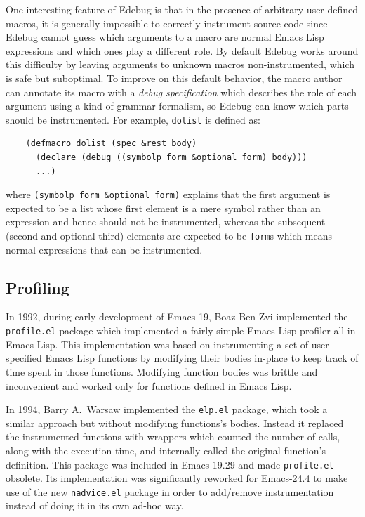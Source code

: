\documentclass[format=acmsmall, review]{acmart}
\newcommand \Elisp {Emacs Lisp}
\begin{document}
One interesting feature of Edebug is that in the presence of arbitrary
user-defined macros, it is generally impossible to correctly instrument
source code since Edebug cannot guess which arguments to a macro are normal
\Elisp{} expressions and which ones play a different role.  By default
Edebug works around this difficulty by leaving arguments to unknown macros
non-instrumented, which is safe but suboptimal.  To improve on this default
behavior, the macro author can annotate its macro with a \emph{debug
  specification} which describes the role of each argument using a kind of
grammar formalism, so Edebug can know which parts should be
instrumented.  For example, \texttt{dolist} is defined as:
\begin{verbatim}
    (defmacro dolist (spec &rest body)
      (declare (debug ((symbolp form &optional form) body)))
      ...)
\end{verbatim}
where \texttt{(symbolp form \&optional form)} explains that the first
argument is expected to be a list whose first element is a mere symbol
rather than an expression and hence should not be instrumented, whereas the
subsequent (second and optional third) elements are expected to be
\texttt{form}s which means normal expressions that can be instrumented.

\subsection{Profiling}
\label{sec:profiler}

In 1992, during early development of Emacs-19, Boaz Ben-Zvi implemented the
\texttt{profile.el} package which implemented a fairly simple \Elisp{}
profiler all in \Elisp{}.  This implementation was based on instrumenting
a set of user-specified \Elisp{} functions by modifying their bodies in-place
to keep track of time spent in those functions. Modifying function
bodies was brittle and inconvenient and worked only for functions
defined in \Elisp.

In 1994, Barry A.~Warsaw implemented the \texttt{elp.el} package, which took
a similar approach but without modifying functions's bodies.
Instead it replaced the instrumented functions with wrappers which counted
the number of calls, along with the execution time, and internally called
the original function's definition.  This package was included in
Emacs-19.29 and made \texttt{profile.el} obsolete.  Its implementation was
significantly reworked for Emacs-24.4 to make use of the new
\texttt{nadvice.el} package in order to add/remove instrumentation instead
of doing it in its own ad-hoc way.
\end{document}
